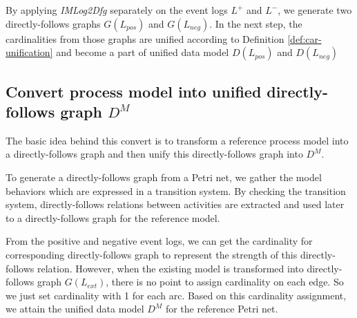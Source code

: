 By applying \emph{IMLog2Dfg} separately on the event logs $L^+$ and $L^-$, we generate two directly-follows graphs $G(L_{pos})$ and $G(L_{neg})$.  In the next step, the cardinalities from those graphs are unified according to Definition \ref{def:car-unification} and become a part of unified data model $D(L_{pos})$ and $D(L_{neg})$

\subsection{Convert process model into unified directly-follows graph $D^M$}
The basic idea behind this convert is to transform a reference process model into a directly-follows graph and then unify this directly-follows graph into $D^M$.


To generate a directly-follows graph from a Petri net, we gather the model behaviors which are expressed in a transition system. By checking the transition system, directly-follows relations between activities are extracted and used later to a directly-follows graph for the reference model.

From the positive and negative event logs, we can get the cardinality for corresponding directly-follows graph to represent the strength of this directly-follows relation. However, when the existing model is transformed into  directly-follows graph $G(L_{ext})$, there is no point to assign cardinality on each edge. So we just set cardinality with 1 for each arc. Based on this cardinality assignment, we attain the unified data model $D^M$ for the reference Petri net.

